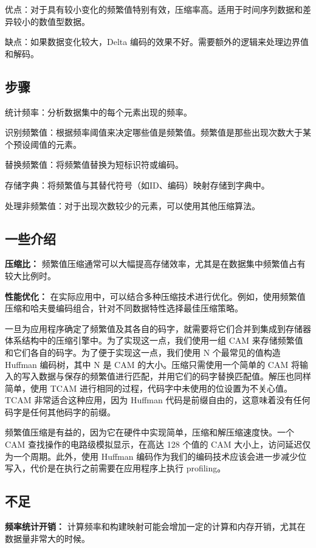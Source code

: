 \documentclass[12pt]{article}
\begin{document}
优点：对于具有较小变化的频繁值特别有效，压缩率高。适用于时间序列数据和差异较小的数值型数据。

缺点：如果数据变化较大，Delta 编码的效果不好。需要额外的逻辑来处理边界值和解码。

\subsection{步骤}
统计频率：分析数据集中的每个元素出现的频率。

识别频繁值：根据频率阈值来决定哪些值是频繁值。频繁值是那些出现次数大于某个预设阈值的元素。

替换频繁值：将频繁值替换为短标识符或编码。

存储字典：将频繁值与其替代符号（如ID、编码）映射存储到字典中。

处理非频繁值：对于出现次数较少的元素，可以使用其他压缩算法。

\subsection{一些介绍}

\textbf{压缩比：} 频繁值压缩通常可以大幅提高存储效率，尤其是在数据集中频繁值占有较大比例时。

\textbf{性能优化：} 在实际应用中，可以结合多种压缩技术进行优化。例如，使用频繁值压缩和哈夫曼编码组合，针对不同数据特性选择最佳压缩策略。

一旦为应用程序确定了频繁值及其各自的码字，就需要将它们合并到集成到存储器体系结构中的压缩引擎中。为了实现这一点，我们使用一组 CAM 来存储频繁值和它们各自的码字。为了便于实现这一点，我们使用 N 个最常见的值构造 Huffman 编码树，其中 N 是 CAM 的大小。压缩只需使用一个简单的 CAM 将输入的写入数据与保存的频繁值进行匹配，并用它们的码字替换匹配值。解压也同样简单，使用 TCAM 进行相同的过程，代码字中未使用的位设置为不关心值。TCAM 非常适合这种应用，因为 Huffman 代码是前缀自由的，这意味着没有任何码字是任何其他码字的前缀。

频繁值压缩是有益的，因为它在硬件中实现简单，压缩和解压缩速度快。一个 CAM 查找操作的电路级模拟显示，在高达 128 个值的 CAM 大小上，访问延迟仅为一个周期。此外，使用 Huffman 编码作为我们的编码技术应该会进一步减少位写入，代价是在执行之前需要在应用程序上执行 profiling。


\subsection{不足}
\textbf{频率统计开销：} 计算频率和构建映射可能会增加一定的计算和内存开销，尤其在数据量非常大的时候。
\end{document}
